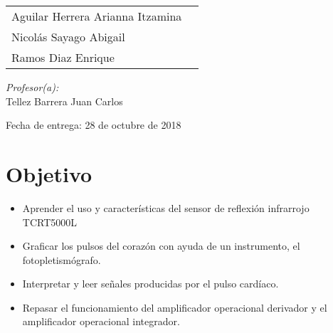 \documentclass[12pt]{article}
\begin{document}
\begin{titlepage}
\begin{center}
\begin{minipage}{0.5\textwidth}
\begin{flushleft}
                        \begin{tabular}{ll}
                        Aguilar Herrera Arianna Itzamina \\
                        Nicolás Sayago Abigail\\
                        Ramos Diaz Enrique \\
                    \end{tabular}
                    \end{flushleft}
                \end{minipage}%
                \begin{minipage}{0.5\textwidth}
                    \begin{flushright} \large
                        \emph{Profesor(a):} \\
                        Tellez Barrera Juan Carlos  \\
                    \end{flushright}
                \end{minipage}
                
                \vfill
                
                {\large Fecha de entrega: 28 de octubre de 2018}
            \end{center}
        \end{titlepage}
    
    \tableofcontents
    \newpage
    
    \section{Objetivo}
        \begin{itemize}
            \item[\checkmark] Aprender el uso y características del sensor de reflexión infrarrojo TCRT5000L
             \item[\checkmark] Graficar los pulsos del corazón con ayuda de un instrumento, el fotopletismógrafo. 
             \item[\checkmark] Interpretar y leer señales producidas por el pulso cardíaco.
             \item[\checkmark] Repasar el funcionamiento del amplificador operacional derivador y el amplificador operacional integrador.
        \end{itemize}
    
\end{document}

